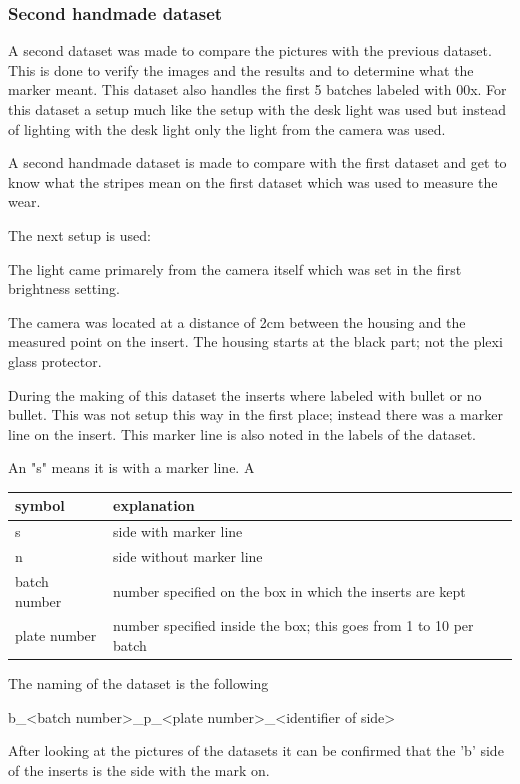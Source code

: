 		\subsubsection{Second handmade dataset}
		\label{sec:impl:ds:shm}

			A second dataset was made to compare the pictures with the previous dataset. This is done to verify the images and the results and to determine what the marker meant. This dataset also handles the first 5 batches labeled with 00x. For this dataset a setup much like the setup with the desk light was used but instead of lighting with the desk light only the light from the camera was used.
			
			A second handmade dataset is made to compare with the first dataset and get to know what the stripes mean on the first dataset which was used to measure the wear.

		The next setup is used:

		The light came primarely from the camera itself which was set in the first brightness setting. 

		The camera was located at a distance of 2cm between the housing and the measured point on the insert. The housing starts at the black part; not the plexi glass protector. 

		During the making of this dataset the inserts where labeled with bullet or no bullet. This was not setup this way in the first place; instead there was a marker line on the insert. This marker line is also noted in the labels of the dataset.

		An "s" means it is with a marker line. A

		\begin{tabular}{ |l|l| }
			\hline
 				symbol & explanation \tabularnewline
			\hline
			\hline
				 s & side with marker line \tabularnewline
			\hline
				 n & side without marker line \tabularnewline
			\hline
				 batch number & number specified on the box in which the inserts are kept \tabularnewline
			\hline
				 plate number & number specified inside the box; this goes from 1 to 10 per batch \tabularnewline
			\hline
		\end{tabular}


		The naming of the dataset is the following

		b\_\textless{}batch number\textgreater{}\_p\_\textless{}plate number\textgreater{}\_\textless{}identifier of side\textgreater{}

		After looking at the pictures of the datasets it can be confirmed that the 'b' side of the inserts is the side with the mark on. 

